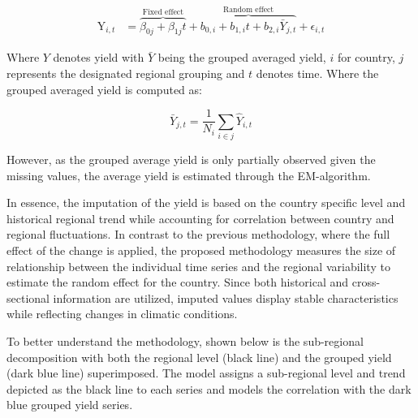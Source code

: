 \documentclass[nojss]{jss}\usepackage{graphicx, color}
\makeatletter
\newenvironment{kframe}{%
 \def\at@end@of@kframe{}%
 \ifinner\ifhmode%
  \def\at@end@of@kframe{\end{minipage}}%
  \begin{minipage}{\columnwidth}%
 \fi\fi%
 \def\FrameCommand##1{\hskip\@totalleftmargin \hskip-\fboxsep
 \colorbox{shadecolor}{##1}\hskip-\fboxsep
     \hskip-\linewidth \hskip-\@totalleftmargin \hskip\columnwidth}%
 \MakeFramed {\advance\hsize-\width
   \@totalleftmargin\z@ \linewidth\hsize
   \@setminipage}}%
 {\par\unskip\endMakeFramed%
 \at@end@of@kframe}
\newenvironment{knitrout}{}{} %
\makeatother
\begin{document}
\begin{align}
  \label{eq:lmeImpute}
  \text{Y}_{i,t} &= \overbrace{\beta_{0j} + \beta_{1j}t}^{\text{Fixed
      effect}} + \overbrace{b_{0,i} + b_{1,i}t +
    b_{2,i}\bar{Y}_{j,t}}^{\text{Random effect}} + \epsilon_{i,t}
\end{align}

Where $Y$ denotes yield with $\bar{Y}$ being the grouped averaged
yield, $i$ for country, $j$ represents the designated regional
grouping and $t$ denotes time. Where the grouped averaged yield is
computed as:

\begin{equation}
  \label{eq:averageYield}
  \bar{Y}_{j, t} = \frac{1}{N_i}\sum_{i \in j} \hat{Y}_{i,t}
\end{equation}

However, as the grouped average yield is only partially observed
given the missing values, the average yield is estimated through the
EM-algorithm.


In essence, the imputation of the yield is based on the country
specific level and historical regional trend while accounting for
correlation between country and regional fluctuations. In contrast to
the previous methodology, where the full effect of the change is
applied, the proposed methodology measures the size of relationship
between the individual time series and the regional variability to
estimate the random effect for the country. Since both historical and
cross-sectional information are utilized, imputed values display
stable characteristics while reflecting changes in climatic
conditions.


To better understand the methodology, shown below is the sub-regional
decomposition with both the regional level (black line) and the
grouped yield (dark blue line) superimposed. The model assigns a
sub-regional level and trend depicted as the black line to each series
and models the correlation with the dark blue grouped yield series.


\begin{knitrout}
\color{fgcolor}\begin{kframe}


{\ttfamily\noindent\bfseries\color{errorcolor}{\#\# Error: object 'plot.df' not found}}

{\ttfamily\noindent\bfseries\color{errorcolor}{\#\# Error: object 'gmean.df' not found}}

{\ttfamily\noindent\bfseries\color{errorcolor}{\#\# Error: object 'plot.df' not found}}

{\ttfamily\noindent\bfseries\color{errorcolor}{\#\# Error: object 'tmp.df' not found}}\end{kframe}
\end{knitrout}
\end{document}
